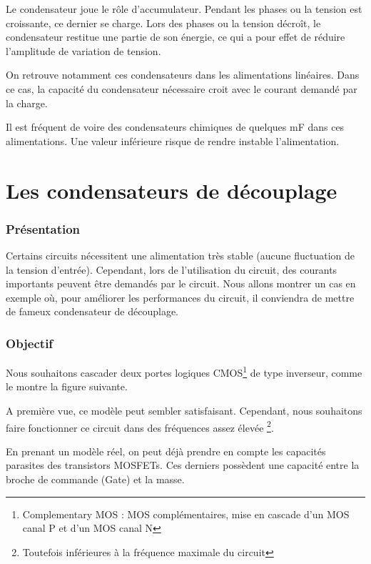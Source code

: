 Le condensateur joue le rôle d'accumulateur. Pendant les phases ou la tension est croissante, ce dernier se charge. \n 
Lors des phases ou la tension décroît, le condensateur restitue une partie de son énergie, ce qui a pour effet de réduire l'amplitude de variation de tension.\n 

On retrouve notamment ces condensateurs dans les alimentations linéaires. \n 
Dans ce cas, la capacité du condensateur nécessaire croit avec le courant demandé par la charge. \n 

Il est fréquent de voire des condensateurs chimiques de quelques mF dans ces alimentations. Une valeur inférieure risque de rendre instable l'alimentation.







\section{Les condensateurs de découplage}

\subsubsection{Présentation}


Certains circuits nécessitent une alimentation très stable (aucune fluctuation de la tension d'entrée). Cependant, lors de l'utilisation du circuit, des courants importants peuvent être demandés par le circuit. \n
Nous allons montrer un cas en exemple où, pour améliorer les performances du circuit, il conviendra de mettre de fameux condensateur de découplage.

\subsubsection{Objectif}

Nous souhaitons cascader deux portes logiques CMOS\footnote{Complementary MOS : MOS complémentaires, mise en cascade d'un MOS canal P et d'un MOS canal N} de type inverseur, comme le montre la figure suivante.


A première vue, ce modèle peut sembler satisfaisant. Cependant, nous souhaitons faire fonctionner ce circuit dans des fréquences assez élevée \footnote{Toutefois inférieures à la fréquence maximale du circuit}.

En prenant un modèle réel, on peut déjà prendre en compte les capacités parasites des transistors MOSFETs. Ces derniers possèdent une capacité entre la broche de commande (Gate) et la masse. \n

